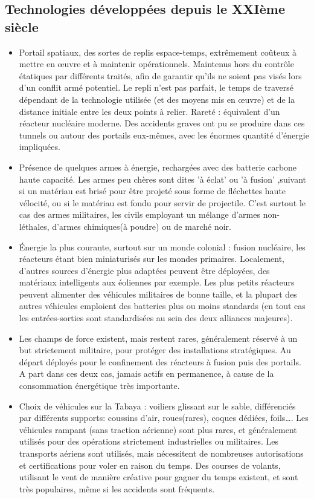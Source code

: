 \documentclass[10pt,a4paper]{book}
\begin{document}
\begin{multicols}{2}
\section{Technologies développées depuis le XXIème siècle}
\begin{itemize}

\item Portail spatiaux, des sortes de replis espace-temps, extrêmement coûteux à mettre en œuvre et à maintenir opérationnels. Maintenus hors du contrôle étatiques par différents traités, afin de garantir qu'ils ne soient pas visés lors d'un conflit armé potentiel. Le repli n'est pas parfait, le temps de traversé dépendant de la technologie utilisée (et des moyens mis en œuvre) et de la distance initiale entre les deux points à relier. Rareté : équivalent d'un réacteur nucléaire moderne. Des accidents graves ont pu se produire dans ces tunnels ou autour des portails eux-mêmes, avec les énormes quantité d'énergie impliquées.
\item Présence de quelques armes à énergie, rechargées avec des batterie carbone haute capacité. Les armes peu chères sont dites 'à éclat' ou 'à fusion' ,suivant si un matériau est brisé pour être projeté sous forme de fléchettes haute vélocité, ou si le matériau est fondu pour servir de projectile. C'est surtout le cas des armes militaires, les civils employant un mélange d'armes non-léthales, d'armes chimiques(à poudre) ou de marché noir.
\item  Énergie la plus courante, surtout sur un monde colonial : fusion nucléaire, les réacteurs étant bien miniaturisés sur les mondes primaires. Localement, d'autres sources d'énergie plus adaptées peuvent être déployées, des matériaux intelligents aux éoliennes par exemple. Les plus petits réacteurs peuvent alimenter des véhicules militaires de bonne taille, et la plupart des autres véhicules emploient des batteries plus ou moins standards (en tout cas les entrées-sorties sont standardisées au sein des deux alliances majeures).
\item  Les champs de force existent, mais restent rares, généralement réservé à un but strictement militaire, pour protéger des installations stratégiques. Au départ déployés pour le confinement des réacteurs à fusion puis des portails. A part dans ces deux cas, jamais actifs en permanence, à cause de la consommation énergétique très importante.
\item  Choix de véhicules sur la Tabaya : voiliers glissant sur le sable, différenciés par différents supports: coussins d'air, roues(rares), coques dédiées, foils…. Les véhicules rampant (sans traction aérienne) sont plus rares, et généralement utilisés pour des opérations strictement industrielles ou militaires. Les transports aériens sont utilisés, mais nécessitent de nombreuses autorisations et certifications pour voler en raison du temps. Des courses de volants, utilisant le vent de manière créative pour gagner du temps existent, et sont très populaires, même si les accidents sont fréquents.

\end{itemize}
\end{multicols}
\end{document}
